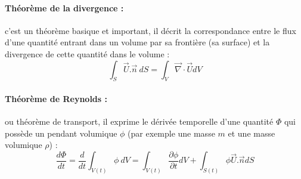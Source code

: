 \paragraph{Théorème de la divergence :}c'est un théorème basique et important, il décrit la correspondance entre le flux d'une quantité entrant dans un volume par sa frontière (sa surface) et la divergence de cette quantité dans le volume :
%
\begin{equation}
\int_{S} {\vec{U}.\vec{n}~dS} = \int_{V} { \vec{\nabla} \cdot \vec{U} dV }
\end{equation}

\paragraph{Théorème de Reynolds :}ou théorème de transport, il exprime le dérivée temporelle d'une quantité $\Phi$ qui possède un pendant volumique $\phi$ (par exemple une masse $m$ et une masse volumique $\rho$) :
%
\begin{equation}
\frac{d\Phi}{dt}
 = \frac{d}{dt} \int_{V(t)} \phi~dV
 = \int_{V(t)} \frac{\partial \phi}{\partial t} dV
 + \int_{S(t)} \phi \vec{U}.\vec{n} dS
\end{equation}